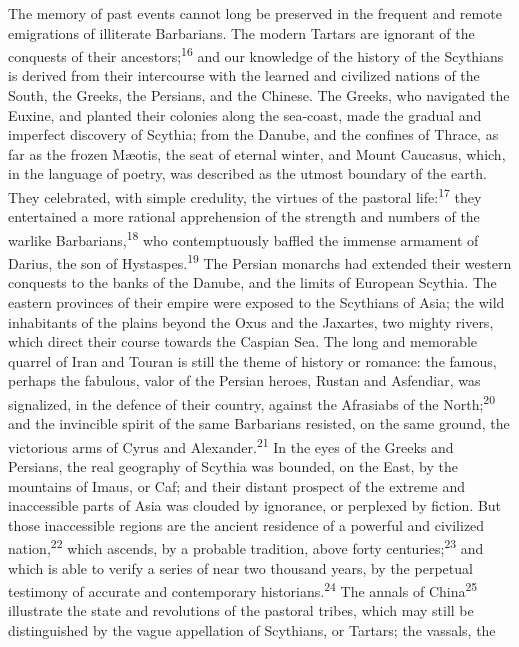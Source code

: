 The memory of past events cannot long be preserved in the
frequent and remote emigrations of illiterate Barbarians. The
modern Tartars are ignorant of the conquests of their ancestors;\textsuperscript{16}
and our knowledge of the history of the Scythians is derived
from their intercourse with the learned and civilized nations of
the South, the Greeks, the Persians, and the Chinese. The Greeks,
who navigated the Euxine, and planted their colonies along the
sea-coast, made the gradual and imperfect discovery of Scythia;
from the Danube, and the confines of Thrace, as far as the frozen
Mæotis, the seat of eternal winter, and Mount Caucasus, which, in
the language of poetry, was described as the utmost boundary of
the earth. They celebrated, with simple credulity, the virtues of
the pastoral life:\textsuperscript{17} they entertained a more rational
apprehension of the strength and numbers of the warlike
Barbarians,\textsuperscript{18} who contemptuously baffled the immense armament of
Darius, the son of Hystaspes.\textsuperscript{19} The Persian monarchs had
extended their western conquests to the banks of the Danube, and
the limits of European Scythia. The eastern provinces of their
empire were exposed to the Scythians of Asia; the wild
inhabitants of the plains beyond the Oxus and the Jaxartes, two
mighty rivers, which direct their course towards the Caspian Sea.
The long and memorable quarrel of Iran and Touran is still the
theme of history or romance: the famous, perhaps the fabulous,
valor of the Persian heroes, Rustan and Asfendiar, was
signalized, in the defence of their country, against the
Afrasiabs of the North;\textsuperscript{20} and the invincible spirit of the same
Barbarians resisted, on the same ground, the victorious arms of
Cyrus and Alexander.\textsuperscript{21} In the eyes of the Greeks and Persians,
the real geography of Scythia was bounded, on the East, by the
mountains of Imaus, or Caf; and their distant prospect of the
extreme and inaccessible parts of Asia was clouded by ignorance,
or perplexed by fiction. But those inaccessible regions are the
ancient residence of a powerful and civilized nation,\textsuperscript{22} which
ascends, by a probable tradition, above forty centuries;\textsuperscript{23} and
which is able to verify a series of near two thousand years, by
the perpetual testimony of accurate and contemporary historians.\textsuperscript{24}
The annals of China\textsuperscript{25} illustrate the state and revolutions of
the pastoral tribes, which may still be distinguished by the
vague appellation of Scythians, or Tartars; the vassals, the
